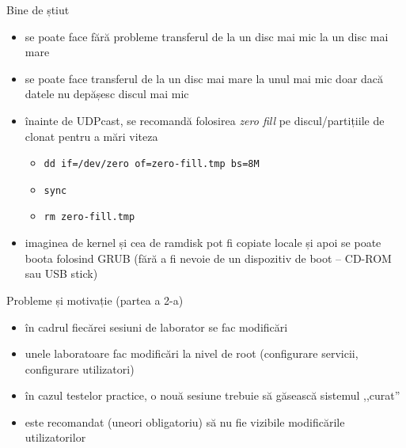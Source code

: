 \documentclass{beamer}
\begin{document}
\begin{frame}{Bine de știut}
  \begin{itemize}
    \item se poate face fără probleme transferul de la un disc mai mic la un
      disc mai mare
    \item se poate face transferul de la un disc mai mare la unul mai mic doar
      dacă datele nu depășesc discul mai mic
    \item înainte de UDPcast, se recomandă folosirea \textit{zero fill} pe
      discul/partițiile de clonat pentru a mări viteza
      \begin{itemize}
        \item \texttt{dd if=/dev/zero of=zero-fill.tmp bs=8M}
        \item \texttt{sync}
        \item \texttt{rm zero-fill.tmp}
      \end{itemize}
    \item imaginea de kernel și cea de ramdisk pot fi copiate locale și apoi
      se poate boota folosind GRUB (fără a fi nevoie de un dispozitiv de boot
      -- CD-ROM sau USB stick)
  \end{itemize}
\end{frame}

\begin{frame}{Probleme și motivație (partea a 2-a)}
  \begin{itemize}
    \item în cadrul fiecărei sesiuni de laborator se fac modificări
    \item unele laboratoare fac modificări la nivel de root (configurare
      servicii, configurare utilizatori)
    \item în cazul testelor practice, o nouă sesiune trebuie să găsească
      sistemul ,,curat''
    \item este recomandat (uneori obligatoriu) să nu fie vizibile modificările
      utilizatorilor
  \end{itemize}
\end{frame}
\end{document}
